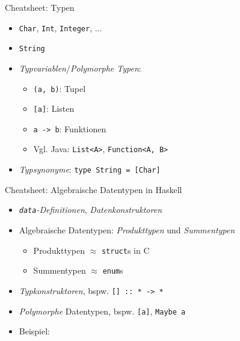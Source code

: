 \documentclass{beamer}
\begin{document}
\begin{frame}{Cheatsheet: Typen}
  \begin{itemize}
    \item \texttt{Char}, \texttt{Int}, \texttt{Integer}, ...
    \item \texttt{String}
    \item \emph{Typvariablen}/\emph{Polymorphe Typen}:
    \begin{itemize}
      \item \texttt{(a, b)}: Tupel
      \item \texttt{[a]}: Listen
      \item \texttt{a -> b}: Funktionen
      \item Vgl. Java: \texttt{List<A>}, \texttt{Function<A, B>}
    \end{itemize}
    \item \emph{Typsynonyme}: \texttt{type String = [Char]}
  \end{itemize}
\end{frame}

\begin{frame}{Cheatsheet: Algebraische Datentypen in Haskell}
  \begin{itemize}
    \item \emph{\texttt{data}-Definitionen}, \emph{Datenkonstruktoren}
    \item Algebraische Datentypen: \emph{Produkttypen} und \emph{Summentypen}
    \begin{itemize}
      \item Produkttypen $\approx$ \texttt{struct}s in C
      \item Summentypen $\approx$ \texttt{enum}s
    \end{itemize}
    \item \emph{Typkonstruktoren}, bspw. \texttt{[] :: * -> *}
    \item \emph{Polymorphe} Datentypen, bspw. \texttt{[a]}, \texttt{Maybe a}
    \item Beispiel:
  \end{itemize}
\end{frame}
\end{document}
